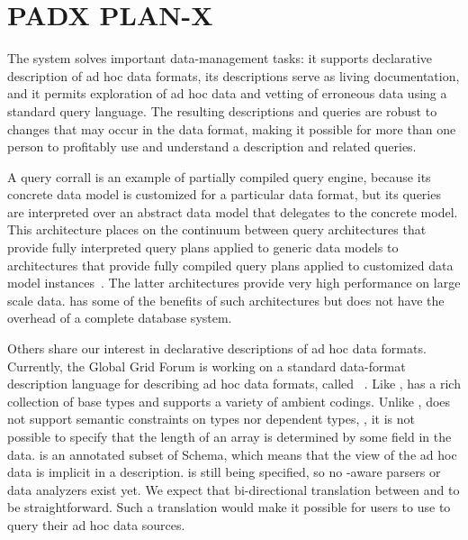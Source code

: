 \documentclass[11pt]{article}
\begin{document}
\section{PADX PLAN-X}

The \padx{} system solves important data-management tasks: it supports
declarative description of ad hoc data formats, its descriptions serve
as living documentation, and it permits exploration of ad hoc data and
vetting of erroneous data using a standard query language.  The
resulting \pads{} descriptions and queries are robust to changes that
may occur in the data format, making it possible for more than one
person to profitably use and understand a \padx{} description and
related queries.

A \padx{} query corrall is an example of partially compiled query
engine, because its concrete data model is customized for a particular
data format, but its queries are interpreted over an abstract data
model that delegates to the concrete model.  This architecture places
\padx{} on the continuum between query architectures that provide
fully interpreted query plans applied to generic data models to
architectures that provide fully compiled query plans applied to
customized data model instances~\cite{daytona}.  The latter
architectures provide very high performance on large scale data.
\padx{} has some of the benefits of such architectures but does not
have the overhead of a complete database system. 

Others share our interest in declarative descriptions of ad hoc data
formats.    Currently, the Global Grid Forum is working on a standard
data-format description language for describing ad hoc data formats,
called \dfdl{}~\cite{dfdl-proposal,dfdl-primer}.  Like \pads{},
\dfdl{} has a rich collection of base types and supports a variety of
ambient codings.  Unlike \pads{}, \dfdl{} does not support semantic
constraints on types nor dependent types, \eg{}, it is not possible to
specify that the length of an array is determined by some field in the
data.  \dfdl{} is an annotated subset of \Xml{} Schema, which means
that the \Xml{} view of the ad hoc data is implicit in a \dfdl{}
description.  \dfdl{} is still being specified, so no \dfdl{}-aware
parsers or data analyzers exist yet.  We expect that bi-directional
translation between \pads{} and \dfdl{} to be straightforward.  Such a
translation would make it possible for \dfdl{} users to use 
\padx{} to query their ad hoc data sources.
\end{document}
